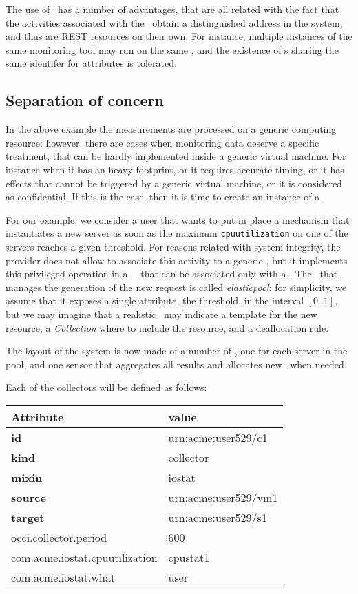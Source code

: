 \documentclass[10pt]{article}  %
\begin{document}
The use of \coll\ has a number of advantages, that are all related with the fact that the activities associated with the \mi\ obtain a distinguished address in the system, and thus are REST resources on their own. For instance, multiple instances of the same monitoring tool may run on the same \rs , and the existence of \mi s sharing the same identifer for attributes is tolerated.

\subsection*{Separation of concern}

In the above example the measurements are processed on a generic computing resource: however, there are cases when monitoring data deserve a specific treatment, that can be hardly implemented inside a generic virtual machine. For instance when it has an heavy footprint, or it requires accurate timing, or it has effects that cannot be triggered by a generic virtual machine, or it is considered as confidential. If this is the case, then it is time to create an instance of a \sens .

For our example, we consider a user that wants to put in place a mechanism that instantiates a new server as soon as the maximum {\tt \small cpuutilization} on one of the servers reaches a given threshold. For reasons related with system integrity, the provider does not allow to associate this activity to a generic \rs , but it implements this privileged operation in a \publ\ \mi\ that can be associated only with a \sens . The \mi\ that manages the generation of the new request is called {\em elasticpool}: for simplicity, we assume that it exposes a single attribute, the threshold, in the interval $[0..1]$, but we may imagine that a realistic \mi\ may indicate a template for the new resource, a {\em Collection} where to include the resource, and a deallocation rule.

The layout of the system is now made of a number of \coll , one for each server in the pool, and one sensor that aggregates all results and allocates new \comp\ when needed.

Each of the collectors will be defined as follows:

{
\small
\begin{tabular}{l|l}
Attribute                         & value \\ \hline
{\bf id}                          & urn:acme:user529/c1 \\
{\bf kind}                        & collector \\
{\bf mixin}                       & iostat    \\
{\bf source}                      & urn:acme:user529/vm1 \\
{\bf target}                      & urn:acme:user529/s1  \\
occi.collector.period             & 600   \\
com.acme.iostat.cpuutilization    & cpustat1   \\                     
com.acme.iostat.what              & user  \\
\end{tabular}
}
\end{document}
